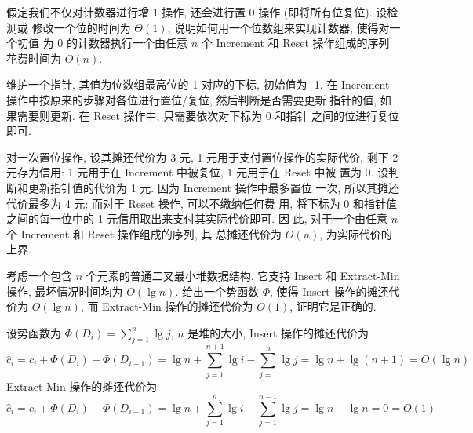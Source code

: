 \documentclass[boxes]{homework}
\begin{document}
\begin{problem}
假定我们不仅对计数器进行增 1 操作, 还会进行置 0 操作 (即将所有位复位). 设检测或
修改一个位的时间为 $\Theta(1)$, 说明如何用一个位数组来实现计数器, 使得对一个初值
为 0 的计数器执行一个由任意 $n$ 个 {\sc Increment} 和 {\sc Reset} 操作组成的序列
花费时间为 $O(n)$.
\end{problem}
\begin{solution}
    维护一个指针, 其值为位数组最高位的 1 对应的下标, 初始值为 -1. 在
    {\sc Increment} 操作中按原来的步骤对各位进行置位/复位, 然后判断是否需要更新
    指针的值, 如果需要则更新. 在 {\sc Reset} 操作中, 只需要依次对下标为 0 和指针
    之间的位进行复位即可.

    对一次置位操作, 设其摊还代价为 3 元, 1 元用于支付置位操作的实际代价, 剩下 2
    元存为信用: 1 元用于在 {\sc Increment} 中被复位, 1 元用于在 {\sc Reset} 中被
    置为 0. 设判断和更新指针值的代价为 1 元. 因为 {\sc Increment} 操作中最多置位
    一次, 所以其摊还代价最多为 4 元; 而对于 {\sc Reset} 操作, 可以不缴纳任何费
    用, 将下标为 0 和指针值之间的每一位中的 1 元信用取出来支付其实际代价即可. 因
    此, 对于一个由任意 $n$ 个 {\sc Increment} 和 {\sc Reset} 操作组成的序列, 其
    总摊还代价为 $O(n)$, 为实际代价的上界.
\end{solution}

\begin{problem}
考虑一个包含 $n$ 个元素的普通二叉最小堆数据结构, 它支持 {\sc Insert} 和 {\sc
Extract-Min} 操作, 最坏情况时间均为 $O(\lg n)$. 给出一个势函数 $\Phi$, 使得 {\sc
Insert} 操作的摊还代价为 $O(\lg n)$, 而 {\sc Extract-Min} 操作的摊还代价为
$O(1)$, 证明它是正确的.
\end{problem}
\begin{solution}
    设势函数为 $\Phi \left( D_{i}\right) = \sum\limits_{j = 1}^{n} \lg j$, $n$
    是堆的大小, {\sc Insert} 操作的摊还代价为
    \begin{equation}
        \hat{c}_{i} = c_{i} + \Phi\left(D_{i}\right) - \Phi\left(D_{i-1}\right)
        = \lg n + \sum_{j = 1}^{n + 1} \lg i - \sum_{j = 1}^{n} \lg j
        = \lg n + \lg (n + 1) = O(\lg n)
    \end{equation}
    {\sc Extract-Min} 操作的摊还代价为
    \begin{equation}
        \hat{c}_{i} = c_{i} + \Phi\left(D_{i}\right) - \Phi\left(D_{i-1}\right)
        = \lg n + \sum_{j = 1}^{n} \lg i - \sum_{j = 1}^{n - 1} \lg j
        = \lg n - \lg n = 0 = O(1)
    \end{equation}
\end{solution}
\end{document}
